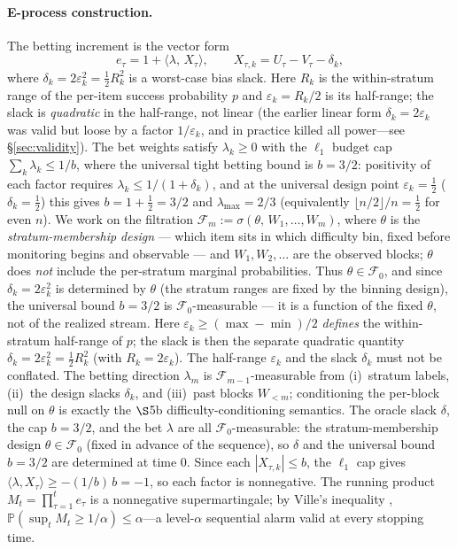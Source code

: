 \documentclass{article}
\begin{document}
\paragraph{E-process construction.}
The betting increment is the vector form
\begin{equation}
  e_\tau = 1 + \langle \lambda,\, X_\tau \rangle,
  \qquad X_{\tau,k} = U_\tau - V_\tau - \delta_k ,
\end{equation}
where $\delta_k = 2\varepsilon_k^2 = \tfrac{1}{2}R_k^2$ is a worst-case bias
slack. Here $R_k$ is the within-stratum range of the per-item success
probability $p$ and $\varepsilon_k = R_k/2$ is its half-range; the slack is
\emph{quadratic} in the half-range, not linear (the earlier linear form
$\delta_k=2\varepsilon_k$ was valid but loose by a factor $1/\varepsilon_k$, and
in practice killed all power---see \S\ref{sec:validity}). The bet weights
satisfy $\lambda_k \ge 0$ with the $\ell_1$ budget cap $\sum_k \lambda_k \le
1/b$, where the universal tight betting bound is $b = 3/2$: positivity of each
factor requires $\lambda_k \le 1/(1+\delta_k)$, and at the universal design
point $\varepsilon_k=\tfrac12$ ($\delta_k=\tfrac12$) this gives
$b=1+\tfrac12=3/2$ and $\lambda_{\max}=2/3$ (equivalently $\lfloor
n/2\rfloor/n=\tfrac12$ for even $n$).
We work on the filtration $\mathcal{F}_m := \sigma(\theta,\, W_1,\dots,W_m)$,
where $\theta$ is the \emph{stratum-membership design} --- which item sits in
which difficulty bin, fixed before monitoring begins and observable --- and
$W_1,W_2,\dots$ are the observed blocks; $\theta$ does \emph{not} include the
per-stratum marginal probabilities.
Thus $\theta\in\mathcal{F}_0$, and since $\delta_k = 2\varepsilon_k^2$ is
determined by $\theta$ (the stratum ranges are fixed by the binning design), the
universal bound $b=3/2$ is $\mathcal{F}_0$-measurable --- it is a function of
the fixed $\theta$, not of the realized stream. Here $\varepsilon_k \ge
(\max - \min)/2$ \emph{defines} the within-stratum half-range of $p$; the slack
is then the separate quadratic quantity $\delta_k = 2\varepsilon_k^2 =
\tfrac12 R_k^2$ (with $R_k = 2\varepsilon_k$). The half-range $\varepsilon_k$
and the slack $\delta_k$ must not be conflated.
The betting direction $\lambda_m$ is $\mathcal{F}_{m-1}$-measurable from
(i)~stratum labels, (ii)~the design slacks $\delta_k$, and
(iii)~past blocks $W_{<m}$; conditioning the per-block null on $\theta$ is
exactly the $\S$5b difficulty-conditioning semantics.
The oracle slack $\delta$, the cap $b=3/2$, and the bet
$\lambda$ are all $\mathcal{F}_0$-measurable: the stratum-membership design
$\theta \in \mathcal{F}_0$ (fixed in advance of the sequence), so $\delta$
and the universal bound $b=3/2$ are determined at time $0$.
Since each $|X_{\tau,k}| \le b$, the $\ell_1$ cap gives
$\langle \lambda, X_\tau \rangle \ge -(1/b)\,b = -1$, so each factor is
nonnegative. The running product $M_t = \prod_{\tau=1}^t e_\tau$ is a nonnegative
supermartingale; by Ville's inequality
\citep{ville1939}, $\mathbb{P}(\sup_t M_t \ge 1/\alpha) \le \alpha$---a
level-$\alpha$ sequential alarm valid at every stopping time.
\end{document}
